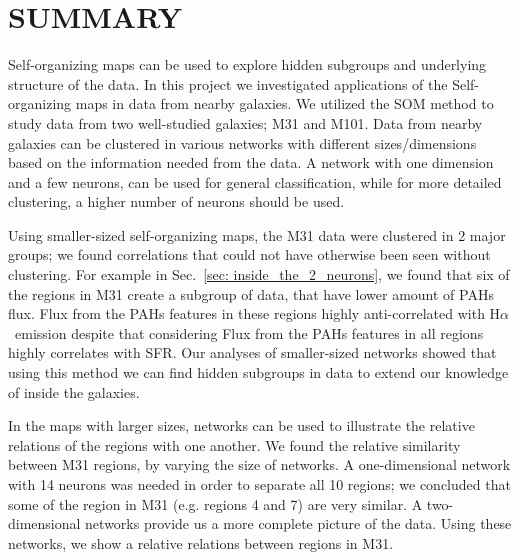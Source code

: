 \documentclass[useAMS,usenatbib]{mn2e}
\newcommand \halpha    {H$\alpha $}
\begin{document}

\section{SUMMARY}
\label{sec: summary}
Self-organizing maps can be used to explore hidden subgroups and underlying structure of the data.
In this project we investigated applications of the Self-organizing maps in data from nearby galaxies.
We utilized the SOM method to study data from two well-studied galaxies; M31 and M101.
Data from nearby galaxies can be clustered in various networks with different sizes/dimensions based on the information needed from the data. 
A network with one dimension and a few neurons, can be used for general classification, while for more detailed clustering, a higher number of neurons should be used.

Using smaller-sized self-organizing maps, the M31 data were clustered in 2 major groups; we found correlations that could not have otherwise been seen without clustering.
For example in Sec.~\ref{sec: inside_the_2_neurons}, we found that six of the regions in M31 create a subgroup of data, that have lower amount of PAHs flux.
Flux from the PAHs features in these regions highly anti-correlated with \halpha~emission despite that considering Flux from the PAHs features in all regions highly correlates with SFR.
Our analyses of smaller-sized networks showed that using this method we can find hidden subgroups in data to extend our knowledge of inside the galaxies.

In the maps with larger sizes, networks can be used to illustrate the relative relations of the regions with one another.
We found the relative similarity between M31 regions, by varying the size of networks.
A one-dimensional network with 14 neurons was needed in order to
separate all 10 regions; we concluded that some of the region in M31 (e.g. regions 4 and 7) are very similar.
A two-dimensional networks provide us a more complete picture of the data.
Using these networks, we show a relative relations between regions in M31.
\end{document}
